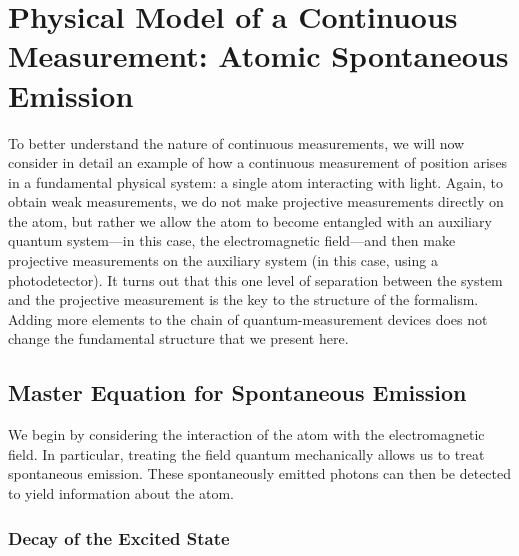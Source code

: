 \documentclass[aps,twocolumn,superscriptaddress,footinbib,floatfix,showpacs]{revtex4}
\begin{document}
\section{Physical Model of a Continuous Measurement: Atomic Spontaneous
Emission}

To better understand the nature of continuous measurements, we will
now consider in detail an example of how a continuous measurement
of position
arises in a fundamental physical system: a single atom interacting
with light.
Again, to obtain weak measurements, we do not make projective measurements
directly on the atom, but rather we allow the atom to become entangled
with an auxiliary quantum system---in this case, the electromagnetic field---and
then make projective measurements on the auxiliary system (in this case,
using a photodetector).  It turns out that this one level of separation
between the system and the projective measurement is the key
to the structure of the formalism.  Adding more elements to the chain
of quantum-measurement devices does not change the fundamental structure that
we present here.
 

\subsection{Master Equation for Spontaneous Emission}

We begin by considering the interaction of the atom with the electromagnetic
field.  In particular, treating the field quantum mechanically allows
us to treat spontaneous emission.  These spontaneously emitted photons
can then be detected to yield information about the atom.

\subsubsection{Decay of the Excited State}
\end{document}
